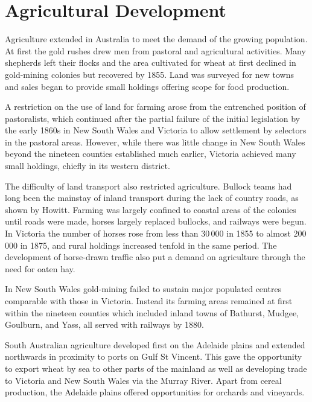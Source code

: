 \section*{Agricultural Development}

Agriculture extended in Australia to meet the demand of the growing
population.  At first the gold rushes drew men from pastoral and
agricultural activities.  Many shepherds left their flocks and the
area cultivated for wheat at first declined in gold-mining colonies
but recovered by 1855.  Land was surveyed for new towns and sales
began to provide small holdings offering scope for food production.

A restriction on the use of land for farming arose from the entrenched
position of pastoralists,  which continued after
the partial failure of the initial legislation by the early 1860s in
New South Wales and Victoria to allow settlement by selectors in the
pastoral areas.  However, while there was little change in New South
Wales beyond the nineteen counties established much earlier, Victoria
achieved many small holdings, chiefly in its western
district.

The difficulty of land transport also restricted agriculture.  Bullock
teams had long been the mainstay of inland transport during the lack
of country roads, as shown by Howitt.  Farming was largely confined to
coastal areas of the colonies until roads were made, horses largely
replaced bullocks, and railways were begun.  In Victoria
 the number of
horses  rose from less than 30\,000 in 1855 to almost
200\,000 in 1875, and rural holdings increased tenfold in the same
period.  The development of horse-drawn traffic also put a demand on
agriculture through the need for oaten hay.

In New South Wales  gold-mining failed to
sustain major populated centres comparable with those in Victoria.
Instead its farming areas remained at first within the nineteen
counties which included inland towns of Bathurst, 
Mudgee,  Goulburn,
 and Yass,  all served with
railways by 1880.

South Australian  agriculture developed first
on the Adelaide plains and extended northwards in proximity to ports
on Gulf St Vincent.  This gave the opportunity to export wheat by sea
to other parts of the mainland as well as developing trade to Victoria
and New South Wales via the Murray River.  Apart
from cereal production, the Adelaide plains offered opportunities for
orchards and vineyards.

